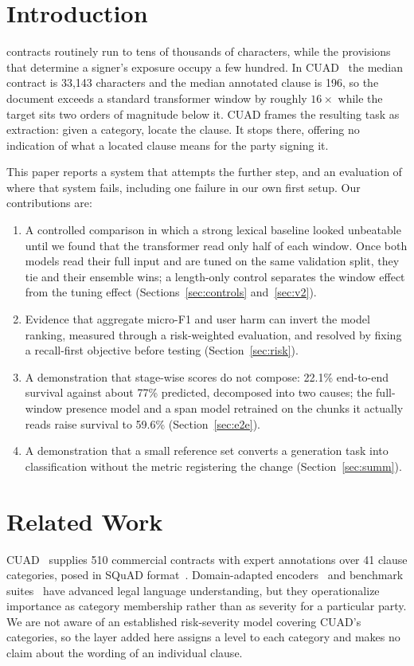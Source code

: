 \documentclass[journal]{IEEEtran}
\begin{document}
\section{Introduction}
 contracts routinely run to tens of thousands of characters, while the
provisions that determine a signer's exposure occupy a few hundred. In CUAD~\cite{cuad} the median
contract is 33,143 characters and the median annotated clause is 196, so the document exceeds a
standard transformer window by roughly $16\times$ while the target sits two orders of magnitude
below it. CUAD frames the resulting task as extraction: given a category, locate the clause. It
stops there, offering no indication of what a located clause means for the party signing it.

This paper reports a system that attempts the further step, and an evaluation of where that system
fails, including one failure in our own first setup. Our contributions are:

\begin{enumerate}
\item A controlled comparison in which a strong lexical baseline looked unbeatable until we found
that the transformer read only half of each window. Once both models read their full input and are
tuned on the same validation split, they tie and their ensemble wins; a length-only control
separates the window effect from the tuning effect (Sections~\ref{sec:controls}
and~\ref{sec:v2}).
\item Evidence that aggregate micro-F1 and user harm can invert the model ranking, measured through
a risk-weighted evaluation, and resolved by fixing a recall-first objective before testing
(Section~\ref{sec:risk}).
\item A demonstration that stage-wise scores do not compose: 22.1\% end-to-end survival against
about 77\% predicted, decomposed into two causes; the full-window presence model and a span model
retrained on the chunks it actually reads raise survival to 59.6\% (Section~\ref{sec:e2e}).
\item A demonstration that a small reference set converts a generation task into classification
without the metric registering the change (Section~\ref{sec:summ}).
\end{enumerate}

\section{Related Work}
CUAD~\cite{cuad} supplies 510 commercial contracts with expert annotations over 41 clause
categories, posed in SQuAD format~\cite{squad}. Domain-adapted encoders~\cite{legalbert} and
benchmark suites~\cite{lexglue} have advanced legal language understanding, but they operationalize
importance as category membership rather than as severity for a particular party. We are not aware
of an established risk-severity model covering CUAD's categories, so the layer added here assigns a
level to each category and makes no claim about the wording of an individual clause.
\end{document}
